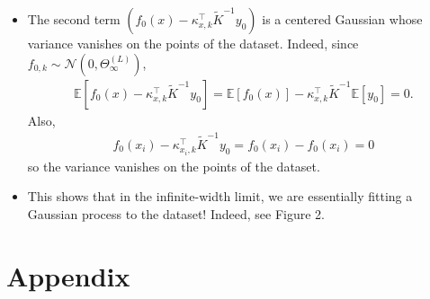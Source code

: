 \documentclass[10pt]{article}
\newcommand{\EE}{\mathbb{E}}
\newcommand{\NN}{\mathcal{N}}
\newcommand{\paran}[1]{{( #1 )}}
\begin{document}
\begin{itemize}
\item The second term $(f_0(x) - \kappa^\top_{x,k} \tilde{K}^{-1} y_0)$ is a centered Gaussian whose variance vanishes on the points of the dataset. Indeed, since $f_{0,k} \sim \NN(0,\Theta^\paran{L}_\infty)$,
\begin{align*}
\EE[f_0(x) - \kappa^\top_{x,k} \tilde{K}^{-1} y_0] = \EE[f_0(x)] - \kappa^\top_{x,k} \tilde{K}^{-1} \EE[y_0] = 0.
\end{align*}
Also,
\begin{align*}
f_0(x_i) - \kappa^\top_{x_i,k} \tilde{K}^{-1} y_0 = f_0(x_i) - f_0(x_i) = 0
\end{align*}
so the variance vanishes on the points of the dataset.
\item This shows that in the infinite-width limit, we are essentially fitting a Gaussian process to the dataset! Indeed, see Figure 2.
\end{itemize}

\appendix

\section{Appendix}
\end{document}
